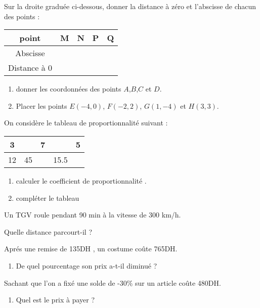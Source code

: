 \documentclass[a4paper,12pt]{article}
\begin{document}
\begin{exo}
Sur la droite graduée ci-dessous, donner la distance à zéro et l’abscisse de chacun des points   :


\begin{tabular}{|c|c|c|c|c|}
\hline 
point & M & N & P & Q \\ 
\hline 
Abscisse &  &  &  &  \\ 
\hline 
Distance à 0 &  &  &  &  \\ 
\hline 
\end{tabular} 
\begin{enumerate}
\item donner les coordonnées des points $A$,$B$,$C$ et $D$.
\item Placer les points $E(-4, 0)$, $F(-2, 2)$, $G(1, -4)$ et $H(3, 3)$.
\end{enumerate}
\begin{reper}
\end{reper}
\end{exo}

\begin{exo}
On considère le tableau de proportionnalité suivant :
\begin{tabular}{|c|c|c|c|c|}
\hline 
3 &  & 7 &  & 5 \\ 
\hline 
12 & 45 &  & 15.5 &  \\ 
\hline 
\end{tabular} 
\begin{enumerate}
\item calculer le coefficient de proportionnalité .
\item compléter le tableau 
\end{enumerate}
\end{exo}


\begin{exo}
Un TGV roule pendant 90 min  à la vitesse de 300 km/h.

Quelle distance parcourt-il ?
\end{exo}

\begin{exo}
Aprés une remise de 135DH , un costume coûte 765DH.
\begin{enumerate}
\item  De quel pourcentage son prix a-t-il diminué ?
\end{enumerate}
 Sachant que l'on a fixé une solde de -30\% sur un article coûte 480DH.
\begin{enumerate}
\item Quel est le prix à payer ?
\end{enumerate}
\end{exo}
\end{document}
